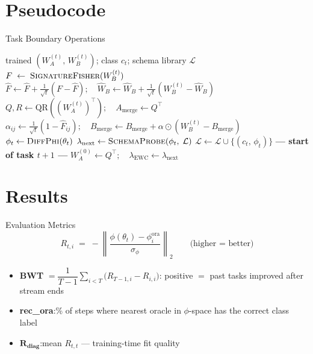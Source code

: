 \documentclass[10pt]{beamer}
\begin{document}
\section{Pseudocode}

\begin{frame}{Task Boundary Operations}
\footnotesize
\begin{algorithmic}[1]
\Require trained $(W_A^{(t)},\,W_B^{(t)})$;\; class $c_t$;\; schema library $\mathcal{L}$
\State $F \;\leftarrow\; \textsc{SignatureFisher}(W_B^{(t)})$
\State $\hat{F} \leftarrow \hat{F} + \tfrac{1}{\sqrt{t}}(F - \hat{F});\quad
       \hat{W}_B \leftarrow \hat{W}_B + \tfrac{1}{\sqrt{t}}(W_B^{(t)}-\hat{W}_B)$
\State $Q,R \leftarrow \mathrm{QR}\!\left((W_A^{(t)})^\top\right);\quad
       A_\mathrm{merge} \leftarrow Q^\top$
\State $\alpha_{ij} \leftarrow \tfrac{1}{\sqrt{t}}(1-\hat{F}_{ij});\quad
       B_\mathrm{merge} \leftarrow B_\mathrm{merge} + \alpha\!\odot\!(W_B^{(t)}-B_\mathrm{merge})$
\State $\phi_t \leftarrow \textsc{DiffPhi}(\theta_t)$
\State $\lambda_\mathrm{next} \leftarrow \textsc{SchemaProbe}(\phi_t,\;\mathcal{L})$
\State $\mathcal{L} \leftarrow \mathcal{L}\cup\{(c_t,\,\phi_t)\}$
\Statex
\Statex \textbf{--- start of task $t+1$ ---}
\State $W_A^{(0)} \leftarrow Q^\top;\quad \lambda_\mathrm{EWC} \leftarrow \lambda_\mathrm{next}$
\end{algorithmic}
\end{frame}

\section{Results}

\begin{frame}{Evaluation Metrics}
\[
  R_{t,i} \;=\; -\left\|\frac{\phi(\theta_t) - \phi_i^\mathrm{ora}}{\sigma_\phi}\right\|_2
  \qquad\text{(higher = better)}
\]
\begin{itemize}
  \item \textbf{BWT} $= \dfrac{1}{T-1}\displaystyle\sum_{i<T}\!\bigl(R_{T-1,i}-R_{i,i}\bigr)$:\quad
        positive $=$ past tasks improved after stream ends
  \medskip
  \item \textbf{rec\_ora}:\quad \% of steps where nearest oracle in $\phi$-space has the correct class label
  \medskip
  \item $\boldsymbol{R}_\textbf{diag}$:\quad mean $R_{t,t}$ — training-time fit quality
\end{itemize}
\end{frame}
\end{document}
